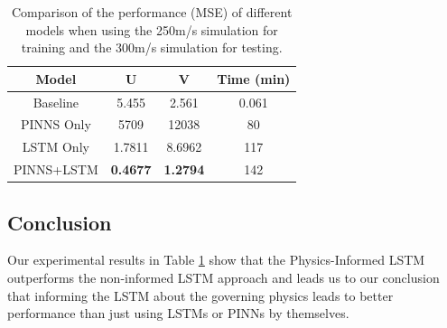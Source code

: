 \begin{table}[h!] \centering
    \begin{tabular}{c|c|c|c}
        \textbf{Model} & \textbf{U} & \textbf{V} & \textbf{Time (min)} \\ \hline
        Baseline & 5.455 & 2.561 & 0.061 \\ \hline
        PINNS Only & 5709 & 12038 & 80 \\ \hline
        LSTM Only & 1.7811 & 8.6962 & 117 \\ \hline
        PINNS+LSTM & \textbf{0.4677} & \textbf{1.2794} & 142 \\ \hline
    \end{tabular}
    \caption{Comparison of the performance (MSE) of different models when using the 250m/s simulation for training and the 300m/s simulation for testing.}
    \label{tab:physics_lstm_results}
\end{table}


\subsection{Conclusion}
Our experimental results in Table \ref{tab:physics_lstm_results} show that the Physics-Informed LSTM outperforms the non-informed LSTM approach and leads us to our conclusion that informing the LSTM about the governing physics leads to better performance than just using LSTMs or PINNs by themselves.